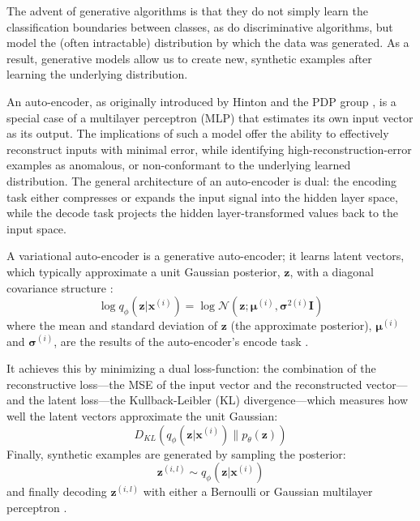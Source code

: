 \documentclass[twoside,11pt]{article}
\begin{document}
The advent of generative algorithms is that they do not simply learn the classification boundaries between classes, as do discriminative algorithms, but model the (often intractable) distribution by which the data was generated. As a result, generative models allow us to create new, synthetic examples after learning the underlying distribution. 

An auto-encoder, as originally introduced by Hinton and the PDP group \citep{rumelhart1985learning}, is a special case of a multilayer perceptron (MLP) that estimates its own input vector as its output. The implications of such a model offer the ability to effectively reconstruct inputs with minimal error, while identifying high-reconstruction-error examples as anomalous, or non-conformant to the underlying learned distribution. The general architecture of an auto-encoder is dual: the encoding task either compresses or expands the input signal into the hidden layer space, while the decode task projects the hidden layer-transformed values back to the input space.


A variational auto-encoder is a generative auto-encoder; it learns latent vectors, which typically approximate a unit Gaussian posterior, $\mathbf{z}$, with a diagonal covariance structure \citep{kingma2013auto}:
\begin{equation}
    \log q_{\phi}(\mathbf{z}|\mathbf{x}^{(i)}) = \log \mathcal{N}(\mathbf{z}; \bm{\mu}^{(i)}, \bm{\sigma}^{2(i)}\mathbf{I})
\end{equation}
where the mean and standard deviation of $\mathbf{z}$ (the approximate posterior), $\bm{\mu}^{(i)}$ and $\bm{\sigma}^{(i)}$, are the results of the auto-encoder's encode task \citep{kingma2013auto}.

It achieves this by minimizing a dual loss-function: the combination of the reconstructive loss---the MSE of the input vector and the reconstructed vector---and the latent loss---the Kullback-Leibler (KL) divergence---which measures how well the latent vectors approximate the unit Gaussian:
\begin{equation}
    D_{KL}(q_{\phi}(\mathbf{z}|\mathbf{x}^{(i)})\parallel p_{\theta}(\mathbf{z}))
\end{equation}
Finally, synthetic examples are generated by sampling the posterior:
\begin{equation}
    \mathbf{z}^{(i,l)} \sim q_{\phi}(\mathbf{z}|\mathbf{x}^{(i)})
\end{equation}
and finally decoding $\mathbf{z}^{(i,l)}$ with either a Bernoulli or Gaussian multilayer perceptron \citep{kingma2013auto}.
\end{document}
